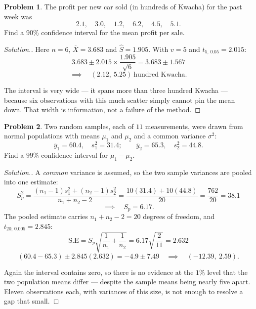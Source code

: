 \documentclass[11pt,a4paper]{article}
\theoremstyle{definition}
\newtheorem{problemx}{Problem}[section]
\newenvironment{problem}{\begin{problemx}}{\end{problemx}}
\newenvironment{solution}
  {\renewcommand{\qedsymbol}{}\begin{proof}[\textit{Solution}.]}
  {\end{proof}}
\begin{document}
\begin{problem}
The profit per new car sold (in hundreds of Kwacha) for the past week was
\[2.1,\quad 3.0,\quad 1.2,\quad 6.2,\quad 4.5,\quad 5.1.\]
Find a $90\%$ confidence interval for the mean profit per sale.
\end{problem}

\begin{solution}
Here $n=6$, $\overline{X}=3.683$ and $\widehat{S}=1.905$. With $v=5$ and
$t_{5,\,0.05}=2.015$:
\[3.683\pm 2.015\times\frac{1.905}{\sqrt{6}}=3.683\pm 1.567\]
\[\implies\quad (2.12,\ 5.25)\ \text{hundred Kwacha}.\]

The interval is very wide --- it spans more than three hundred Kwacha --- because six
observations with this much scatter simply cannot pin the mean down. That width is
information, not a failure of the method.
\end{solution}

\begin{problem}
Two random samples, each of $11$ measurements, were drawn from normal populations with means
$\mu_1$ and $\mu_2$ and a common variance $\sigma^2$:
\[\overline{y}_1=60.4,\quad s_1^2=31.4;\qquad \overline{y}_2=65.3,\quad s_2^2=44.8.\]
Find a $99\%$ confidence interval for $\mu_1-\mu_2$.
\end{problem}

\begin{solution}
A \emph{common} variance is assumed, so the two sample variances are pooled into one
estimate:
\[S_p^2=\frac{(n_1-1)s_1^2+(n_2-1)s_2^2}{n_1+n_2-2}
=\frac{10(31.4)+10(44.8)}{20}=\frac{762}{20}=38.1\]
\[\implies\quad S_p=6.17.\]
The pooled estimate carries $n_1+n_2-2=20$ degrees of freedom, and $t_{20,\,0.005}=2.845$:
\[\text{S.E}=S_p\sqrt{\frac{1}{n_1}+\frac{1}{n_2}}=6.17\sqrt{\frac{2}{11}}=2.632\]
\[(60.4-65.3)\pm 2.845(2.632)=-4.9\pm 7.49
\quad\implies\quad (-12.39,\ 2.59).\]

Again the interval contains zero, so there is no evidence at the $1\%$ level that the two
population means differ --- despite the sample means being nearly five apart. Eleven
observations each, with variances of this size, is not enough to resolve a gap that small.
\end{solution}
\end{document}

